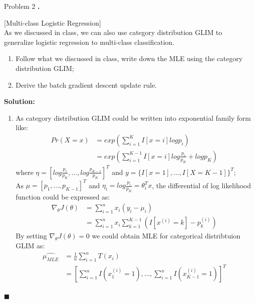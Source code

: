 \documentclass{article}
\newcounter{pcounter}                                   %
\newenvironment{problem}                                %
{                                                       %
    \color{gray}                                        %
    \stepcounter{pcounter}                              %
    \textbf{\arabic{pcounter}.}                         %
}{}                                                     %
\newenvironment{solution}                               %
{\textbf{Solution:} }{$\blacksquare$}                   %
\begin{document}
\begin{section}{Problem 2}
        \begin{problem}
            [Multi-class Logistic Regression]\\
            As we discussed in class, we can also use category distribution GLIM to generalize logistic regression to multi-class classification.
            \begin{enumerate}[label=(\alph*)]
                \item Follow what we discussed in class, write down the MLE using the category distribution GLIM;
                \item Derive the batch gradient descent update rule.
            \end{enumerate}
        \end{problem}

        \begin{solution}
            \begin{enumerate}[label=(\alph*)]
                \item As category distribution GLIM could be written into exponential family form like:
                \begin{align*}
                    Pr(X=x) &= exp(\sum_{i=1}^{K} I[x=i] log p_i) \\
                    &= exp(\sum_{i=1}^{K-1} I[x=i] log{\frac{p_i}{p_K}} + log{p_K})
                \end{align*}
                where $\eta = [log{\frac{p_1}{p_K}}, \dots, log{\frac{p_{K-1}}{p_K}}]^T$ and $y = \{I[x=1], \dots, I[X=K-1]\}^T$;\\
                As $\mu = [p_1, \dots, p_{K-1}]^T$ and $\eta_i = log{\frac{p_i}{p_K}} = \theta_i^T x$, the differential of log likelihood function could be expressed as:
                \begin{align*}
                    \nabla_\theta J(\theta) &= \sum_{i=1}^{n} x_i(y_i - \mu_i) \\
                    &= \sum_{i=1}^{n} x_i \sum_{k=1}^{K-1} (I[x^{(i)}=k] - p^{(i)}_k)
                \end{align*}
                By setting $\nabla_\theta J(\theta) = 0$ we could obtain MLE for categorical distribtuion GLIM as:
                \begin{align*}
                    \hat{\mu_{MLE}} &= \frac{1}{n} \sum_{i=1}^{n} T(x_i) \\
                    &= [\sum_{i=1}^{n} I(x^{(i)}_1=1), \dots, \sum_{i=1}^{n} I(x^{(i)}_{K-1}=1)]^T
                \end{align*}
                

\end{enumerate}
\end{solution}
\end{section}
\end{document}
